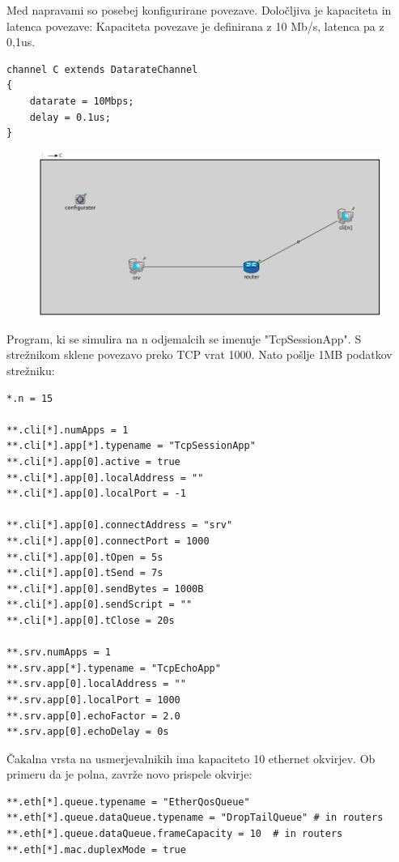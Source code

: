\documentclass[11pt,a4paper,slovene]{myarticle}
\begin{document}
Med napravami so posebej konfigurirane povezave. Določljiva je kapaciteta in latenca povezave:
Kapaciteta povezave je definirana z 10 Mb/s, latenca pa z 0,1us.
\begin{lstlisting}
channel C extends DatarateChannel
{
    datarate = 10Mbps;
    delay = 0.1us;
}
\end{lstlisting}

\begin{figure}[h]
  \includegraphics[width=\linewidth]{omrezje3.png}
\end{figure}

Program, ki se simulira na n odjemalcih se imenuje "TcpSessionApp". S strežnikom sklene povezavo preko TCP vrat 1000. Nato pošlje 1MB podatkov strežniku:
\begin{lstlisting}
*.n = 15

**.cli[*].numApps = 1
**.cli[*].app[*].typename = "TcpSessionApp"
**.cli[*].app[0].active = true
**.cli[*].app[0].localAddress = ""
**.cli[*].app[0].localPort = -1

**.cli[*].app[0].connectAddress = "srv"
**.cli[*].app[0].connectPort = 1000
**.cli[*].app[0].tOpen = 5s
**.cli[*].app[0].tSend = 7s
**.cli[*].app[0].sendBytes = 1000B
**.cli[*].app[0].sendScript = ""
**.cli[*].app[0].tClose = 20s

**.srv.numApps = 1
**.srv.app[*].typename = "TcpEchoApp"
**.srv.app[0].localAddress = ""
**.srv.app[0].localPort = 1000
**.srv.app[0].echoFactor = 2.0
**.srv.app[0].echoDelay = 0s
\end{lstlisting}

Čakalna vrsta na usmerjevalnikih ima kapaciteto 10 ethernet okvirjev. Ob primeru da je polna, zavrže novo prispele okvirje:
\begin{lstlisting}
**.eth[*].queue.typename = "EtherQosQueue"
**.eth[*].queue.dataQueue.typename = "DropTailQueue" # in routers
**.eth[*].queue.dataQueue.frameCapacity = 10  # in routers
**.eth[*].mac.duplexMode = true
\end{lstlisting}
\end{document}
